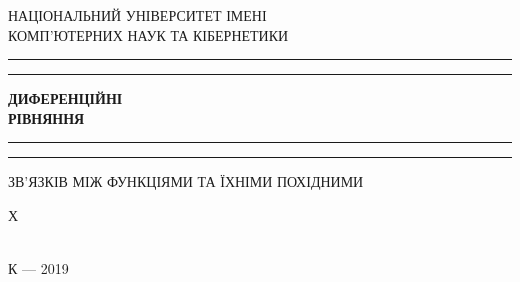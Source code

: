 \documentclass[a4paper, 12pt, oneside]{book}
\begin{document}
\begin{titlepage} %

	\centering
	
	{ НАЦІОНАЛЬНИЙ УНІВЕРСИТЕТ ІМЕНІ   \\  КОМП'ЮТЕРНИХ НАУК ТА КІБЕРНЕТИКИ}
	
	\vfill
	
	\rule{\textwidth}{1.6pt}\vspace*{-\baselineskip}\vspace*{2pt} %
	\rule{\textwidth}{0.4pt} %
	
	\vspace{0.75\baselineskip}
	
	{\huge \bfseries ДИФЕРЕНЦІЙНІ\\ РІВНЯННЯ\\}
	
	\vspace{0.75\baselineskip}
	
	\rule{\textwidth}{0.4pt}\vspace*{-\baselineskip}\vspace{3.2pt} %
	\rule{\textwidth}{1.6pt} %
	
	\vspace{\baselineskip}
	
	{ ЗВ'ЯЗКІВ МІЖ ФУНКЦІЯМИ ТА ЇХНІМИ ПОХІДНИМИ}
	
	\vfill
	
	{ \Large Х \\   \\}
	
	\vfill
	
	\vfill
	
	{К{\normalsize} --- 2019}

\end{titlepage}
\end{document}
